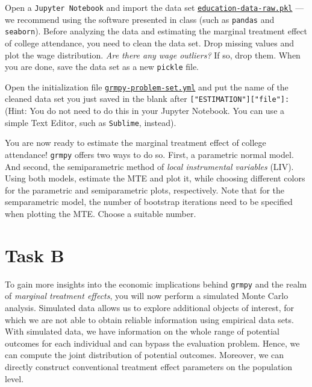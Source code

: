 \begin{boenumerate}

  \item Open a \texttt{Jupyter Notebook} and import the data set \href{https://github.com/HumanCapitalAnalysis/microeconometrics/tree/peisenha_integration_problem_set/problem-sets/01-potential-outcome-model/data}{\texttt{education-data-raw.pkl}} --- we recommend using the software presented in class (such as \texttt{pandas} and \texttt{seaborn}). 
  Before analyzing the data and estimating the marginal treatment effect of college attendance, you need to clean the data set. Drop missing values and plot the wage distribution. \emph{Are there any wage outliers?} If so, drop them.
  When you are done, save the data set as a new \texttt{pickle} file.
  
   \item Open the initialization file \href{https://github.com/HumanCapitalAnalysis/microeconometrics/tree/peisenha_integration_problem_set/problem-sets/01-potential-outcome-model/data}{\texttt{grmpy-problem-set.yml}} and put the name of the cleaned data set you just saved in the blank after \texttt{["ESTIMATION"]["file"]:} (Hint: You do not need to do this in your Jupyter Notebook. You can use a simple Text Editor, such as \texttt{Sublime}, instead).
   
   \item You are now ready to estimate the marginal treatment effect of college attendance! \texttt{grmpy} offers two ways to do so. First, a parametric normal model. And second, the semiparametric method of \emph{local instrumental variables} (LIV).
   Using both models, estimate the MTE and plot it, while choosing different colors for the parametric and semiparametric plots, respectively. Note that for the semparametric model, the number of bootstrap iterations need to be specified when plotting the MTE. Choose a suitable number.

\end{boenumerate}


\section*{Task B}

   To gain more insights into the economic implications behind \texttt{grmpy} and the realm of \emph{marginal treatment effects}, you will now perform a simulated Monte Carlo analysis. 
   Simulated data allows us to explore additional objects of interest, for which we are not able to obtain reliable information using empirical data sets. With simulated data, we have information on the whole range of potential outcomes for each individual and can bypass the evaluation problem. Hence, we can compute the joint distribution of potential outcomes. Moreover, we can directly construct conventional treatment effect parameters on the population level.\\


